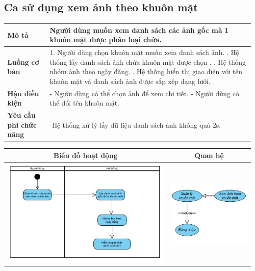 \subsection{Ca sử dụng xem ảnh theo khuôn mặt}

\vspace{0.5cm}

\noindent 
\begin{tabularx}{\linewidth}{| l | X |} 
\hline 
\textbf{Mô tả} & Người dùng muốn xem danh sách các ảnh gốc mà 1 khuôn mặt được phân loại chứa. \\
\hline 
\textbf{Luồng cơ bản} & 1. Người dùng chọn khuôn mặt muốn xem danh sách ảnh. \newline
                       2. Hệ thống lấy danh sách ảnh chứa khuôn mặt được chọn . \newline
                       3. Hệ thống nhóm ảnh theo ngày đăng. \newline
                       5. Hệ thống hiển thị giao diện với tên khuôn mặt và danh sách ảnh được sắp xếp dạng lưới. \\
\hline 
\textbf{Hậu điều kiện} & - Người dùng có thể chọn ảnh để xem chi tiết. \newline
                          - Người dùng có thể đổi tên khuôn mặt. \\
\hline 
\textbf{Yêu cầu phi chức năng} & -Hệ thống xử lý lấy dữ liệu danh sách ảnh không quá 2s. \\
\hline 
\end{tabularx}

\vspace{0.8cm}

\noindent 
\begin{tabular}{| c | c |}
    \hline
    \textbf{Biểu đồ hoạt động} & \textbf{Quan hệ} \\ 
    \hline
    \includegraphics[width=0.6\linewidth]{figures/c3/3-3-11-activity-diagram.png} 
    &  
    \includegraphics[width=0.35\linewidth]{figures/c3/3-3-11-relationship.png} \\ 
    \hline
\end{tabular}

